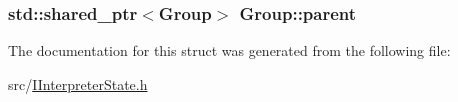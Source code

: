 \subsubsection[{\texorpdfstring{parent}{parent}}]{\setlength{\rightskip}{0pt plus 5cm}std\+::shared\+\_\+ptr$<${\bf Group}$>$ Group\+::parent}\hypertarget{struct_group_a97509613c8c410bb6a3c281b102a1532}{}\label{struct_group_a97509613c8c410bb6a3c281b102a1532}


The documentation for this struct was generated from the following file\+:\begin{DoxyCompactItemize}
\item 
src/\hyperlink{_i_interpreter_state_8h}{I\+Interpreter\+State.\+h}\end{DoxyCompactItemize}

